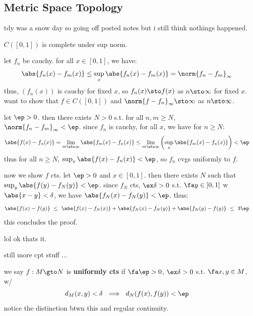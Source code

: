 \subsection{Metric Space Topology}

tdy was a snow day so going off posted notes but i still think
nothings happened.

\begin{xmp}[source=Primary Source Material]
    $C([0,1])$ is complete under sup norm.

	let $f_{n}$ be cauchy. for all $x\in[0,1]$, we have:
	\begin{equation*}
	    \abs{f_{n}(x)-f_{m}(x)}\leq\sup_{x}\abs{f_{n}(x)-f_{m}(x)}
		=\norm{f_{n}-f_{m}}_{\infty}
	\end{equation*}
	thus, $(f_{n}(x))$ is cauchy for fixed $x$, so $f_{n}(x)\sto f(x)$ as
	$n\sto\infty$ for fixed $x$.
	want to show that $f\in C([0,1])$ and $\norm{f-f_{n}}_{\infty}\sto\infty$
	as $n\sto\infty$.

	let $\ep>0$. then there exists $N>0$ s.t. for all $n,m\geq N$,
	$\norm{f_{n}-f_{m}}_{\infty}<\ep$.
	since $f_{n}$ is cauchy, for all $x$, we have for $n\geq N$:
	\begin{equation*}
		\abs{f(x)-f_{n}(x)}=\lim_{m\sto\infty}\abs{f_{m}(x)-f_{n}(x)} \leq
		\lim_{m\sto\infty}\left(\sup_{x}\abs{f_{m}(x)-f_{n}(x)}\right) <\ep
	\end{equation*}
	thus for all $n\geq N$, $\sup_{x}\abs{f(x)-f_{n}(x)}<\ep$, so
	$f_{n}$ cvgs uniformly to $f$.

	now we show $f$ cts. let $\ep>0$ and $x\in[0,1]$.
	then there exists $N$ such that \\
	$\sup_{y}\abs{f(y)-f_{N}(y)}<\ep$.
	since $f_{N}$ cts, $\ex\delta>0$ s.t. $\fa y\in[0,1]$ w $\abs{x-y}<\delta$,
	we have $\abs{f_{N}(x)-f_{N}(y)}<\ep$. thus:
	\begin{equation*}
	    \abs{f(x)-f(y)} \ \leq \
		\abs{f(x)-f_{N}(x)}+\abs{f_{N}(x)-f_{N}(y)}+\abs{f_{N}(y)-f(y)}
		\ \leq \ 3\ep
	\end{equation*}
	this concludes the proof.
\end{xmp}

lol ok thats it.


still more cpt stuff ...

\begin{defn}
    we say $f:M\gto N$ is \textbf{uniformly cts} if $\fa\ep>0$,
	$\ex\delta>0$ s.t. $\fa x,y\in M$, w/
	\begin{equation*}
	    d_{M}(x,y)<\delta \ \implies \ d_{N}(f(x),f(y))<\ep
	\end{equation*}
	notice the distinction btwn this and regular continuity.
\end{defn} \

